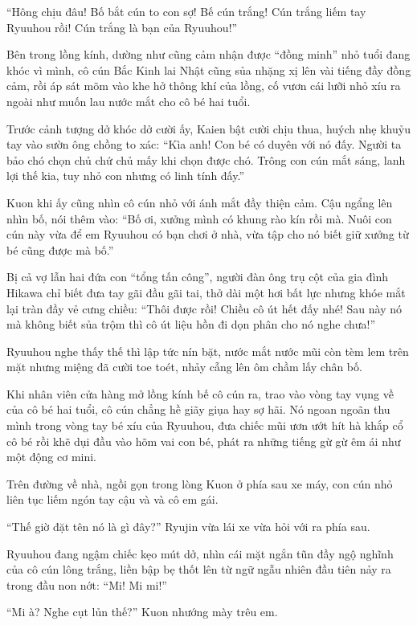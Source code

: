 \documentclass[../main.tex]{subfiles}
\begin{document}
``Hông chịu đâu! Bố bắt cún to con sợ! Bế cún trắng! Cún trắng liếm tay Ryuuhou rồi! Cún trắng là bạn của Ryuuhou!''

Bên trong lồng kính, dường như cũng cảm nhận được ``đồng minh'' nhỏ tuổi đang khóc vì mình, cô cún Bắc Kinh lai Nhật cũng sủa nhặng xị lên vài tiếng đầy đồng cảm, rồi áp sát mõm vào khe hở thông khí của lồng, cố vươn cái lưỡi nhỏ xíu ra ngoài như muốn lau nước mắt cho cô bé hai tuổi.

Trước cảnh tượng dở khóc dở cười ấy, Kaien bật cười chịu thua, huých nhẹ khuỷu tay vào sườn ông chồng to xác: ``Kìa anh! Con bé có duyên với nó đấy. Người ta bảo chó chọn chủ chứ chủ mấy khi chọn được chó. Trông con cún mắt sáng, lanh lợi thế kia, tuy nhỏ con nhưng có linh tính đấy.''

Kuon khi ấy cũng nhìn cô cún nhỏ với ánh mắt đầy thiện cảm. Cậu ngẩng lên nhìn bố, nói thêm vào: ``Bố ơi, xưởng mình có khung rào kín rồi mà. Nuôi con cún này vừa để em Ryuuhou có bạn chơi ở nhà, vừa tập cho nó biết giữ xưởng từ bé cũng được mà bố.''

Bị cả vợ lẫn hai đứa con ``tổng tấn công'', người đàn ông trụ cột của gia đình Hikawa chỉ biết đưa tay gãi đầu gãi tai, thở dài một hơi bất lực nhưng khóe mắt lại tràn đầy vẻ cưng chiều: ``Thôi được rồi! Chiều cô út hết đấy nhé! Sau này nó mà không biết sủa trộm thì cô út liệu hồn đi dọn phân cho nó nghe chưa!''

Ryuuhou nghe thấy thế thì lập tức nín bặt, nước mắt nước mũi còn tèm lem trên mặt nhưng miệng đã cười toe toét, nhảy cẫng lên ôm chầm lấy chân bố.

Khi nhân viên cửa hàng mở lồng kính bế cô cún ra, trao vào vòng tay vụng về của cô bé hai tuổi, cô cún chẳng hề giãy giụa hay sợ hãi. Nó ngoan ngoãn thu mình trong vòng tay bé xíu của Ryuuhou, đưa chiếc mũi ươn ướt hít hà khắp cổ cô bé rồi khẽ dụi đầu vào hõm vai con bé, phát ra những tiếng gừ gừ êm ái như một động cơ mini.

Trên đường về nhà, ngồi gọn trong lòng Kuon ở phía sau xe máy, con cún nhỏ liên tục liếm ngón tay cậu và và cô em gái.

``Thế giờ đặt tên nó là gì đây?'' Ryujin vừa lái xe vừa hỏi với ra phía sau.

Ryuuhou đang ngậm chiếc kẹo mút dở, nhìn cái mặt ngắn tũn đầy ngộ nghĩnh của cô cún lông trắng, liền bập bẹ thốt lên từ ngữ ngẫu nhiên đầu tiên nảy ra trong đầu non nớt: ``Mi! Mi mi!''

``Mi à? Nghe cụt lủn thế?'' Kuon nhướng mày trêu em.
\end{document}
